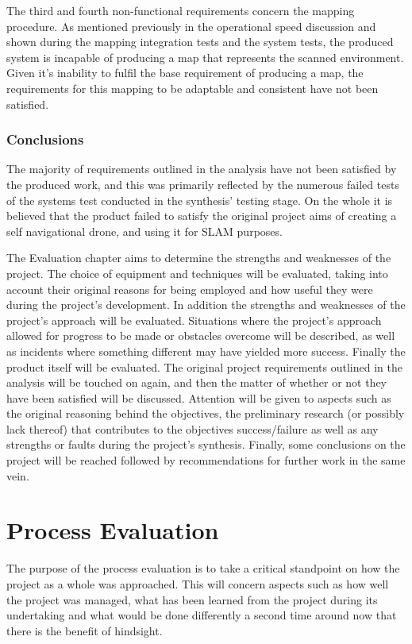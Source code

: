 		The third and fourth non-functional requirements concern the mapping procedure. As mentioned previously in the operational speed discussion and shown during the mapping integration tests and the system tests, the produced system is incapable of producing a map that represents the scanned environment. Given it's inability to fulfil the base requirement of producing a map, the requirements for this mapping to be adaptable and consistent have not been satisfied.
	
		\subsection{Conclusions}
		The majority of requirements outlined in the analysis have not been satisfied by the produced work, and this was primarily reflected by the numerous failed tests of the systems test conducted in the synthesis' testing stage. On the whole it is believed that the product failed to satisfy the original project aims of creating a self navigational drone, and using it for SLAM purposes. 
	
	
		The Evaluation chapter aims to determine the strengths and weaknesses of the project. The choice of equipment and techniques will be evaluated, taking into account their original reasons for being employed and how useful they were during the project's development. In addition the strengths and weaknesses of the project's approach will be evaluated. Situations where the project's approach allowed for progress to be made or obstacles overcome will be described, as well as incidents where something different may have yielded more success. Finally the product itself will be evaluated. The original project requirements outlined in the analysis will be touched on again, and then the matter of whether or not they have been satisfied will be discussed. Attention will be given to aspects such as the original reasoning behind the objectives, the preliminary research (or possibly lack thereof) that contributes to the objectives success/failure as well as any strengths or faults during the project's synthesis. Finally, some conclusions on the project will be reached followed by recommendations for further work in the same vein. 
	
	
	
	\chapter{Process Evaluation}
	\label{evaluation:processevaluation}
	The purpose of the process evaluation is to take a critical standpoint on how the project as a whole was approached. This will concern aspects such as how well the project was managed, what has been learned from the project during its undertaking and what would be done differently a second time around now that there is the benefit of hindsight.
	
